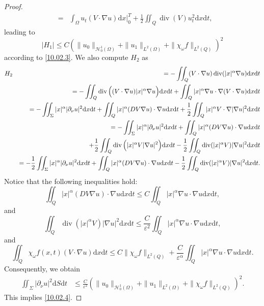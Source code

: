 \documentclass[11pt]{article}
\numberwithin{equation}{section}
\def\pt{\partial}
\def\e{\varepsilon }
\def\pt{\partial}
\def\Om{\Omega}
\def\al{\alpha}
\def\f{\frac}
\def\df{\mathrm d}
\def\mcH{\mathcal{H}}
\DeclareMathOperator{\Div}{div}
\begin{document}
\begin{proof}
\begin{eqnarray*}
				&=&\int_\Om u_t(V\cdot\nabla u)\df x\Big|_0^T+\f{1}{2}\iint_Q \Div (V) u_t^2\df x\df t,
			\end{eqnarray*}
			leading to
			\begin{equation*}
				|H_1|\leq C\left(\|u_0\|_{\mcH_0^1(\Om)}+\|u_1\|_{L^2(\Om)}+\|\chi_\omega f\|_{L^2(Q)}\right)^2
			\end{equation*}
			according to \eqref{10.02.3}. We also compute $H_2$ as
			\begin{eqnarray*}
				H_2
				&&=-\iint_Q(V\cdot \nabla u)\Div (|x|^\al \nabla u)\df x\df t\\
				&&=-\iint_Q \Div\Big((V\cdot \nabla u)|x|^\al \nabla u\Big)\df x\df t+\iint_Q |x|^\al \nabla u\cdot \nabla (V\cdot \nabla u)\df x\df t\\
				&&=-\iint_\Sigma |x|^\al |\pt_\nu u|^2\df x\df t+\iint_Q |x|^\al (DV\nabla u)\cdot \nabla u\df x\df t+\f{1}{2}\iint_Q |x|^\al V\cdot \nabla |\nabla u|^2\df x\df t\\
				&&=-\iint_\Sigma |x|^\al |\pt_\nu u|^2\df x\df t+\iint_Q |x|^\al (DV\nabla u)\cdot \nabla u\df x\df t\\
				&&\hspace{4.5mm}+\f{1}{2}\iint_Q \Div\Big(|x|^\al V  |\nabla u|^2\Big)\df x\df t-\f{1}{2}\iint_Q \Div(|x|^\al V)|\nabla u|^2\df x\df t\\
				&&=-\f{1}{2}\iint_\Sigma |x|^\al |\pt_\nu u|^2\df x\df t+\iint_Q|x|^\al (DV\nabla u)\cdot \nabla u\df x\df t-\f{1}{2}\iint_Q \Div(|x|^\al V)|\nabla u|^2\df x\df t.
			\end{eqnarray*}
			Notice that the following inequalities hold:
			\begin{equation*}
				\iint_Q|x|^\al(DV\nabla u)\cdot \nabla u\df x\df t\leq C\iint_Q|x|^\al \nabla u\cdot \nabla u\df x\df t,
			\end{equation*}
			and
			\begin{equation*}
				\iint_Q\Div(|x|^\al V)|\nabla u|^2\df x\df t\leq \f{C}{\e^2}\iint_Q|x|^\al \nabla u\cdot \nabla u\df x\df t,
			\end{equation*}
			and
			\begin{equation*}
				\iint_Q\chi_\omega f(x,t)(V\cdot \nabla u)\df x\df t\leq C\|\chi_\omega f\|_{L^2(Q)}+\f{C}{\e^\al}\iint_Q|x|^\al \nabla u\cdot \nabla u \df x\df t.
			\end{equation*}
			Consequently, we obtain
			\begin{equation*}
				\begin{split}
					\iint_\Sigma |\pt_\nu u|^2\df S\df t
					&\leq \f{C}{\e^2}\left(\|u_0\|_{\mcH_0^1(\Om)}+\|u_1\|_{L^2(\Om)}+\|\chi_\omega f\|_{L^2(Q)}\right)^2.
				\end{split}
			\end{equation*}
			This implies \eqref{10.02.4}.
		\end{proof}
		
\end{document}
